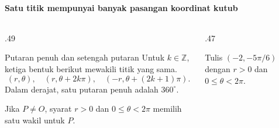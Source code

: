 \documentclass{../../kalkulus-ppt}
\begin{document}
\begin{frame}{\insertsection}
    \framesubtitle{Satu titik mempunyai banyak pasangan koordinat kutub}
    \begin{columns}[T,onlytextwidth]
        \begin{column}{.49\textwidth}
            \begin{block}{Putaran penuh dan setengah putaran}
                Untuk $k\in\mathbb{Z}$, ketiga bentuk berikut
                mewakili titik yang sama.
                \[
                    (r,\theta),\quad (r,\theta+2k\pi),\quad
                    (-r,\theta+(2k+1)\pi).
                \]
                Dalam derajat, satu putaran penuh adalah $360^\circ$.
            \end{block}
            Jika $P\ne O$, syarat $r>0$ dan
            $0\le\theta<2\pi$ memilih satu wakil untuk $P$.
        \end{column}
        \begin{column}{.47\textwidth}
            \begin{contoh}
                Tulis $(-2,-5\pi/6)$ dengan $r>0$
                dan $0\le\theta<2\pi$.
            \end{contoh}
        \end{column}
    \end{columns}
\end{frame}
\end{document}

